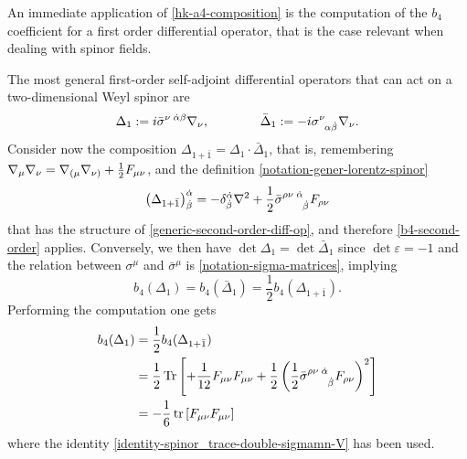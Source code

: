 An immediate application of \eqref{hk-a4-composition} is the computation of the $b_4$ coefficient for a first order differential operator, that is the case relevant when dealing with spinor fields.

The most general first-order self-adjoint differential operators that can act on a two-dimensional Weyl spinor are
\begin{equation}
\Delta_1 :=  i \bar \sigma^{\nu\; \dot \alpha \beta}\covD_\nu,
 \hspace{4em}
\bar \Delta_{1} := - i 	\sigma\indices{^{\nu}_{ \alpha \dot \beta} } \covD_\nu.
\end{equation}  
Consider now the composition \( \Delta_{1+\bar 1} = \Delta_1 \cdot \bar \Delta_{1} \), that is, remembering \({ \mathcal{\nabla} }_\mu { \mathcal{\nabla} }_\nu =  { \mathcal{\nabla} }_{(\mu} { \mathcal{\nabla} }_{\nu)} + \frac{1}{2} F_{\mu\nu}\), and the definition \eqref{notation-gener-lorentz-spinor}
\begin{equation}
\left(\Delta_{ 1 + \bar 1 }\right)^{\dot\alpha}_{\dot \beta}
=
 - \delta^{\dot\alpha}_{\dot \beta} \covD^2
			+ \frac{1}{2} \bar \sigma\indices{^{\rho \nu\; \dot \alpha}_{\dot\beta}} F_{\rho \nu}
\end{equation}
that has the structure of \eqref{generic-second-order-diff-op}, and therefore \eqref{b4-second-order} applies.
Conversely, we then have
\(
\det \Delta_1 = \det \bar \Delta_{1}
\)
since \( \det \varepsilon = -1\) and the relation between $ \sigma^\mu $ and $ \bar \sigma^\mu $ is \eqref{notation-sigma-matrices}, implying 
\begin{equation}
b_4 \left( \Delta_1  \right)
=
b_4 \left( \bar \Delta_{1} \right)
=
\frac{1}{2} b_4 \left( \Delta_{1+\bar 1} \right) .
\end{equation}
Performing the computation one gets
\begin{equation}\label{b4-first-order}
\begin{split}
b_4(\Delta_1)
& = \frac{1}{2} b_4(\Delta_{1+\bar 1})
\\
& =	\frac{1}{2}
	\Tr \left[
		+ \frac{1}{12} F_{\mu\nu} F_{\mu\nu}
		+  \frac{1}{2} \left( \frac{1}{2} \bar \sigma\indices{^{\rho \nu\; \dot \alpha}_{\dot\beta}} F_{\rho \nu} \right)^2
	\right]
\\
& =
-	\frac{1}{6}
	\tr \left[
		  F_{\mu\nu} F_{\mu\nu}
	\right]
\end{split}
\end{equation}
where the identity \eqref{identity-spinor_trace-double-sigmamn-V} has been used.



